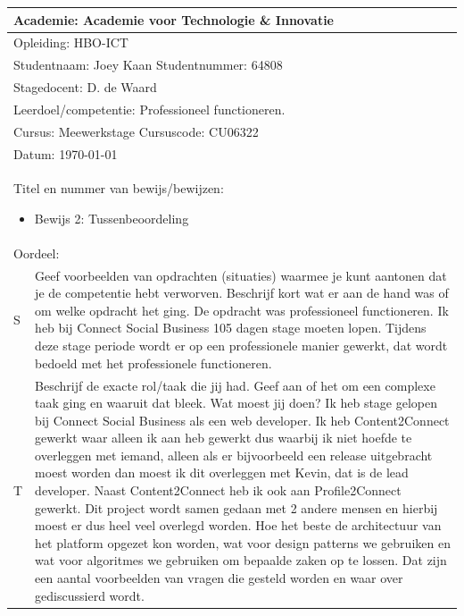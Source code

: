 \begin{tabularx}{\textwidth}{| l | X |}
\hline
\multicolumn{2}{|l|}{Academie: Academie voor Technologie \& Innovatie } \\
\hline
\multicolumn{2}{|l|}{Opleiding: HBO-ICT } \\
\hline
\multicolumn{2}{|l|}{Studentnaam: Joey Kaan \hspace{35pt} Studentnummer: 64808} \\
\hline
\multicolumn{2}{|l|}{Stagedocent: D. de Waard} \\
\hline
\multicolumn{2}{|p{\textwidth-1in}|}{Leerdoel/competentie: Professioneel functioneren.} \\
\hline
\multicolumn{2}{|l|}{Cursus: Meewerkstage \hspace{35pt} Cursuscode: CU06322} \\
\hline
\multicolumn{2}{|l|}{Datum: \today} \\
\hline
\multicolumn{2}{|l|}{
\begin{minipage}{0.9\columnwidth}
Titel en nummer van bewijs/bewijzen:
\begin{itemize}
\item Bewijs 2: Tussenbeoordeling
\end{itemize}
\end{minipage}
} \\ [50pt]
\hline
\multicolumn{2}{|l|}{Oordeel: } \\
\hline
S & Geef voorbeelden van opdrachten (situaties) waarmee je kunt aantonen dat je de competentie hebt verworven. Beschrijf kort wat er aan de hand was of om welke opdracht het ging.
\newline
\newline
De opdracht was professioneel functioneren. Ik heb bij Connect Social Business 105 dagen stage moeten lopen. Tijdens deze stage periode wordt er op een professionele manier gewerkt, dat wordt bedoeld met het professionele functioneren.
\\
\hline
T & Beschrijf de exacte rol/taak die jij had. Geef aan of het om een complexe taak ging en waaruit dat bleek. Wat moest jij doen?
\newline
\newline
Ik heb stage gelopen bij Connect Social Business als een web developer. Ik heb Content2Connect gewerkt waar alleen ik aan heb gewerkt dus waarbij ik niet hoefde te overleggen met iemand, alleen als er bijvoorbeeld een release uitgebracht moest worden dan moest ik dit overleggen met Kevin, dat is de lead developer. Naast Content2Connect heb ik ook aan Profile2Connect gewerkt. Dit project wordt samen gedaan met 2 andere mensen en hierbij moest er dus heel veel overlegd worden. Hoe het beste de architectuur van het platform opgezet kon worden, wat voor design patterns we gebruiken en wat voor algoritmes we gebruiken om bepaalde zaken op te lossen. Dat zijn een aantal voorbeelden van vragen die gesteld worden en waar over gediscussierd wordt.

\end{tabularx}
